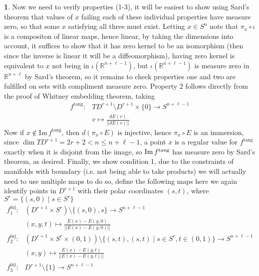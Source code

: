 \documentclass[10.5pt]{article}
\theoremstyle{definition}
\newtheorem{pb}{}
\newcommand{\set}[1]{\{#1\}}
\newcommand{\norm}[1]{\lvert\lvert#1\rvert\rvert}
\begin{document}
\begin{pb}
        Now we need to verify properties (1-3), it will be easiest to show using Sard's theorem that values of \(x\) failing each of these individual properties have measure zero, so that some \(x\) satisfying all three must exist. Letting \(x \in S^n\) note that \(\pi_x\circ \iota\) is a compositon of linear maps, hence linear, by taking the dimensions into account, it suffices to show that it has zero kernel to be an isomorphism (then since the inverse is linear it will be a diffeomorphism), having zero kernel is equivalent to \(x\) not being in \(\iota(\mathbb{R}^{n + \ell - 1})\), but \(\iota(\mathbb{R}^{n + \ell - 1})\) is measure zero in \(\mathbb{R}^{n + \ell}\) by Sard's theorem, so it remains to check properties one and two are fulfilled on sets with compliment measure zero. Property \(2\) follows directly from the proof of Whitney embedding theorem, taking \begin{align*}
            f^{\text{tang}} : &TD^{r+1} \setminus D^{r+1} \times \set{0} \to S^{n + \ell - 1} \\
            &v \mapsto \frac{dE(v)}{\norm{dE(v)}}
        \end{align*}
        Now if \(x \not \in \text{Im}\,f^{\text{tang}}\), then \(d(\pi_x\circ E)\) is injective, hence \(\pi_x \circ E\) is an immersion, since \(\dim TD^{r+1} = 2r+2 < n \leq n + \ell - 1\), a point \(x\) is a regular value for \(f^{\text{tang}}\) exactly when it is disjoint from the image, so \(\text{Im}\,f^\text{\text{tang}}\) has measure zero by Sard's theorem, as desired. Finally, we show condition 1, due to the constraints of manifolds with boundary (i.e. not being able to take products) we will actually need to use multiple maps to do so, define the following maps here we again identify points in \(D^{r+1}\) with their polar coordinates \((s,t)\), where \(S^r = \set{(s,0) \mid s \in S^r}\)
        \begin{align*}
            f^\text{inj}_1: &(D^{r+1} \times S^r) \setminus \set{(s,0),s} \to S^{n + \ell - 1}  \\
            &(x,y,t) \mapsto \frac{E(x) - E(y,0)}{\norm{E(x) - E(y,0)}} \\
            f^{\text{inj}}_2: &(D^{r+1} \times S^r \times (0,1)) \setminus \set{(s,t),(s,t) \mid s \in S^r, t\in (0,1)} \to S^{n + \ell - 1}  \\
            &(x,y) \mapsto \frac{E(x) - E(y,t)}{\norm{E(x) - E(y,t)}}\\
            f^\text{inj}_3: &D^{r+1} \setminus \set{1} \to S^{n + \ell - 1}  \\

\end{align*}
\end{pb}
\end{document}
